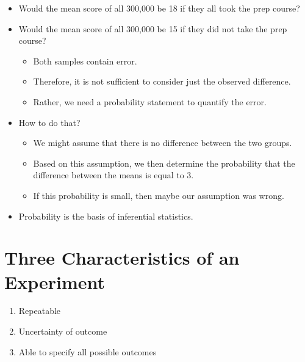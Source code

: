 \documentclass[12pt]{article}
\begin{document}
\begin{itemize}
\itemsep1pt\parskip0pt
\item
  Would the mean score of all 300,000 be 18 if they all took the prep
  course?
\item
  Would the mean score of all 300,000 be 15 if they did not take the
  prep course?

  \begin{itemize}
  \itemsep1pt\parskip0pt
  \item
    Both samples contain error.
  \item
    Therefore, it is not sufficient to consider just the observed
    difference.
  \item
    Rather, we need a probability statement to quantify the error.
  \end{itemize}
\item
  How to do that?

  \begin{itemize}
  \itemsep1pt\parskip0pt
  \item
    We might assume that there is no difference between the two groups.
  \item
    Based on this assumption, we then determine the probability that the
    difference between the means is equal to 3.
  \item
    If this probability is small, then maybe our assumption was wrong.
  \end{itemize}
\item
  Probability is the basis of inferential statistics.
\end{itemize}

\section{Three Characteristics of an
Experiment}\label{three-characteristics-of-an-experiment}

\begin{enumerate}
\def\labelenumi{\arabic{enumi}.}
\itemsep1pt\parskip0pt
\item
  Repeatable
\item
  Uncertainty of outcome
\item
  Able to specify all possible outcomes
\end{enumerate}
\end{document}
